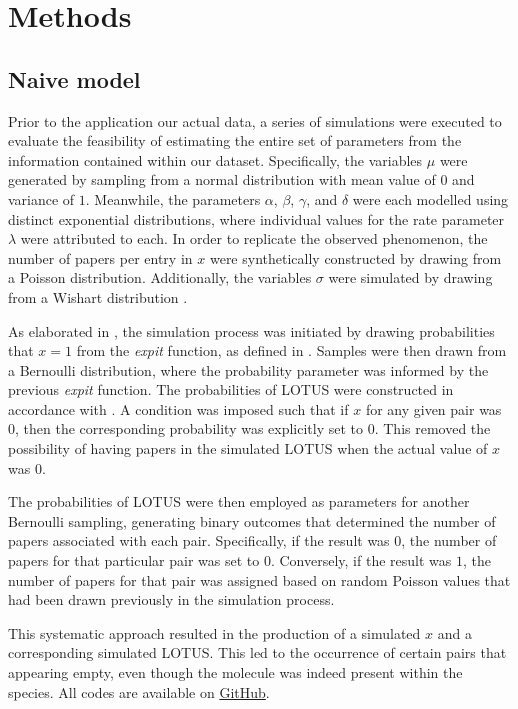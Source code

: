 \documentclass[
11pt, %
oneside, %
english, %
singlespacing, %
headsepline, %
chapterinoneline, %
]{MastersDoctoralThesis} %
\begin{document}
\chapter{Methods}\label{chap:Methods}
\section{Naive model}
Prior to the application our actual data, a series of simulations were executed to evaluate the feasibility of estimating the entire set of parameters from the information contained within our dataset. Specifically, the variables $\mu$ were generated by sampling from a normal distribution with mean value of $0$ and variance of $1$. Meanwhile, the parameters $\alpha$, $\beta$, $\gamma$, and $\delta$ were each modelled using distinct exponential distributions, where individual values for the rate parameter $\lambda$ were attributed to each. In order to replicate the observed phenomenon, the number of papers per entry in $x$ were synthetically constructed by drawing from a Poisson distribution. Additionally, the variables $\sigma$ were simulated by drawing from a Wishart distribution \cite{wishartGENERALISEDPRODUCTMOMENT1928}.

As elaborated in , the simulation process was initiated by drawing probabilities that $x=1$ from the \textit{expit} function, as defined in . 
Samples were then drawn from a Bernoulli distribution, where the probability parameter was informed by the previous \textit{expit} function. The probabilities of LOTUS were constructed in accordance with . A condition was imposed such that if $x$ for any given pair was $0$, then the corresponding probability was explicitly set to $0$. This removed the possibility of having papers in the simulated LOTUS when the actual value of $x$ was $0$.

The probabilities of LOTUS were then employed as parameters for another Bernoulli sampling, generating binary outcomes that determined the number of papers associated with each pair. Specifically, if the result was $0$, the number of papers for that particular pair was set to $0$. Conversely, if the result was $1$, the number of papers for that pair was assigned based on random Poisson values that had been drawn previously in the simulation process.

This systematic approach resulted in the production of a simulated $x$ and a corresponding simulated LOTUS. This led to the occurrence of certain pairs that appearing empty, even though the molecule was indeed present within the species. All codes are available on \href{https://github.com/commons-research/anticipated-lotus}{GitHub}.
 
\end{document}

